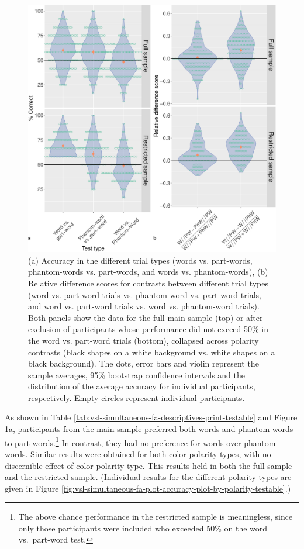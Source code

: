 \documentclass[
]{article}
\begin{document}
\begin{figure}

{\centering \includegraphics[width=0.8\linewidth]{vsl_phamtoms_simultaneous_results_files/figure-latex/vsl-simultaneous-fa-plot-accuracy-diff-scores-plot-polarity-collapsed-testable-1} 

}

\caption{(a) Accuracy in the different trial types (words vs. part-words, phantom-words vs. part-words, and words vs. phantom-words), (b)  Relative difference scores for contrasts between different trial types (word vs. part-word trials vs. phantom-word vs. part-word trials, and word vs. part-word trials vs. word vs. phantom-word trials). Both panels show the data for the full main sample (top) or after exclusion of participants whose performance did not exceed 50\% in the word vs. part-word trials (bottom), collapsed across polarity contrasts (black shapes on a white background vs. white shapes on a black background). The dots, error bars and violin represent the sample averages, 95\% bootstrap confidence intervals and the distribution of the average accuracy for individual participants, respectively. Empty circles represent individual participants.}\label{fig:vsl-simultaneous-fa-plot-accuracy-diff-scores-plot-polarity-collapsed-testable}
\end{figure}

As shown in Table
\ref{tab:vsl-simultaneous-fa-descriptives-print-testable} and Figure
\ref{fig:vsl-simultaneous-fa-plot-accuracy-diff-scores-plot-polarity-collapsed-testable}a,
participants from the main sample preferred both words and phantom-words
to part-words.\footnote{The above chance performance in the restricted
  sample is meaningless, since only those participants were included who
  exceeded 50\% on the word vs.~part-word test.} In contrast, they had
no preference for words over phantom-words. Similar results were
obtained for both color polarity types, with no discernible effect of
color polarity type. This results held in both the full sample and the
restricted sample. (Individual results for the different polarity types
are given in Figure
\ref{fig:vsl-simultaneous-fa-plot-accuracy-plot-by-polarity-testable}.)
\end{document}
